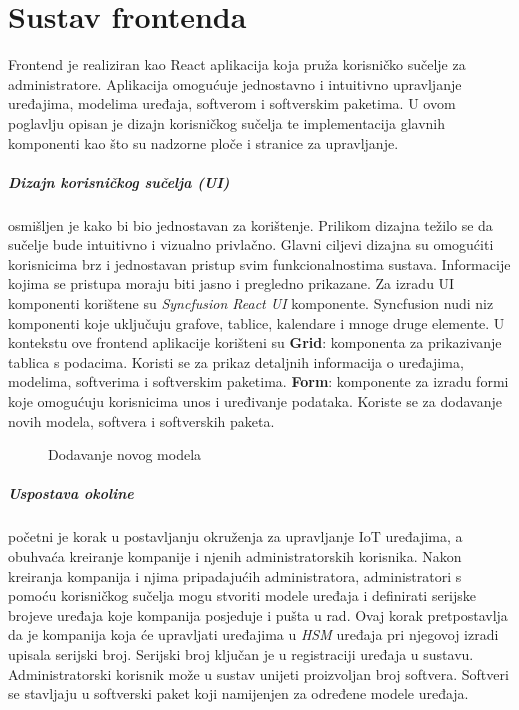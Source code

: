 \documentclass[zavrsnirad]{fer}
\begin{document}
	
	\chapter{Sustav frontenda}
	\label{pog:frontend}
	
	Frontend je realiziran kao React aplikacija koja pruža korisničko sučelje za administratore. Aplikacija omogućuje jednostavno i intuitivno upravljanje uređajima, modelima uređaja, softverom i softverskim paketima. U ovom poglavlju opisan je dizajn korisničkog sučelja te implementacija glavnih komponenti kao što su nadzorne ploče i stranice za upravljanje.
	
	
	\paragraph{Dizajn korisničkog sučelja (UI)} osmišljen je kako bi bio jednostavan za korištenje. Prilikom dizajna težilo se da sučelje bude intuitivno i vizualno privlačno. Glavni ciljevi dizajna su omogućiti korisnicima brz i jednostavan pristup svim funkcionalnostima sustava. Informacije kojima se pristupa moraju biti jasno i pregledno prikazane.
	Za izradu UI komponenti korištene su \textit{Syncfusion React UI} komponente. Syncfusion nudi niz komponenti koje uključuju grafove, tablice, kalendare i mnoge druge elemente. U kontekstu ove frontend aplikacije korišteni su \textbf{Grid}: komponenta za prikazivanje tablica s podacima. Koristi se za prikaz detaljnih informacija o uređajima, modelima, softverima i softverskim paketima. \textbf{Form}: komponente za izradu formi koje omogućuju korisnicima unos i uređivanje podataka. Koriste se za dodavanje novih modela, softvera i softverskih paketa.
	
	\begin{figure}[htb]
		\centering
		\caption{Dodavanje novog modela}
		\label{slk:add_new_model}
	\end{figure}
	
	\paragraph{Uspostava okoline} početni je korak u postavljanju okruženja za upravljanje IoT uređajima, a obuhvaća kreiranje kompanije i njenih administratorskih korisnika. Nakon kreiranja kompanija i njima pripadajućih administratora, administratori s pomoću korisničkog sučelja mogu stvoriti modele uređaja i definirati serijske brojeve uređaja koje kompanija posjeduje i pušta u rad. Ovaj korak pretpostavlja da je kompanija koja će upravljati uređajima u \textit{HSM} uređaja pri njegovoj izradi upisala serijski broj. Serijski broj ključan je u registraciji uređaja u sustavu. Administratorski korisnik može u sustav unijeti proizvoljan broj softvera. Softveri se stavljaju u softverski paket koji namijenjen za određene modele uređaja.
	
\end{document}
